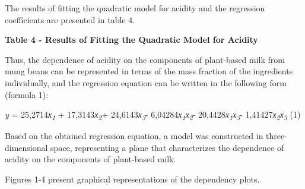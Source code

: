 The results of fitting the quadratic model for acidity and the
regression coefficients are presented in table 4.

{\bfseries Table 4 - Results of Fitting the Quadratic Model for Acidity}


Thus, the dependence of acidity on the components of plant-based milk
from mung beans can be represented in terms of the mass fraction of the
ingredients individually, and the regression equation can be written in
the following form (formula 1):

\emph{y} = 25,2714\emph{х\textsubscript{1 }}+
17,3143\emph{х\textsubscript{2}}+ 24,6143\emph{х\textsubscript{3}}-
6,04284\emph{х\textsubscript{1}х\textsubscript{2}}-
20,4428\emph{х\textsubscript{1}х\textsubscript{3}}-
1,41427\emph{х\textsubscript{2}х\textsubscript{3}} (1)

Based on the obtained regression equation, a model was constructed in
three-dimensional space, representing a plane that characterizes the
dependence of acidity on the components of plant-based milk.

Figures 1-4 present graphical representations of the dependency plots.

